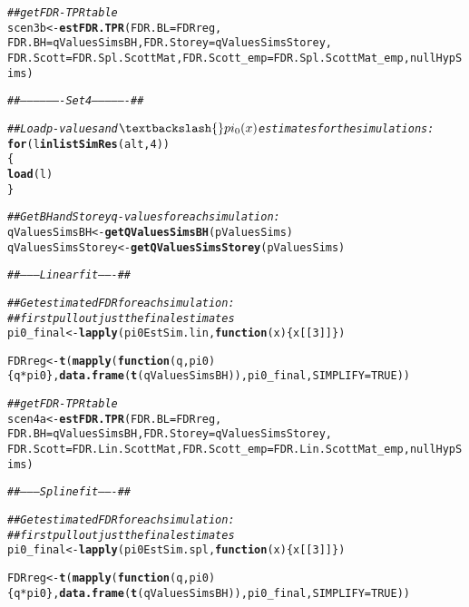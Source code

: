 \documentclass{article}\usepackage[]{graphicx}\usepackage[]{color}
\makeatletter
\newcommand{\hlnum}[1]{\textcolor[rgb]{0.686,0.059,0.569}{#1}}%
\newcommand{\hlcom}[1]{\textcolor[rgb]{0.678,0.584,0.686}{\textit{#1}}}%
\newcommand{\hlopt}[1]{\textcolor[rgb]{0,0,0}{#1}}%
\newcommand{\hlstd}[1]{\textcolor[rgb]{0.345,0.345,0.345}{#1}}%
\newcommand{\hlkwa}[1]{\textcolor[rgb]{0.161,0.373,0.58}{\textbf{#1}}}%
\newcommand{\hlkwb}[1]{\textcolor[rgb]{0.69,0.353,0.396}{#1}}%
\newcommand{\hlkwc}[1]{\textcolor[rgb]{0.333,0.667,0.333}{#1}}%
\newcommand{\hlkwd}[1]{\textcolor[rgb]{0.737,0.353,0.396}{\textbf{#1}}}%
\newenvironment{kframe}{%
 \def\at@end@of@kframe{}%
 \ifinner\ifhmode%
  \def\at@end@of@kframe{\end{minipage}}%
  \begin{minipage}{\columnwidth}%
 \fi\fi%
 \def\FrameCommand##1{\hskip\@totalleftmargin \hskip-\fboxsep
 \colorbox{shadecolor}{##1}\hskip-\fboxsep
     \hskip-\linewidth \hskip-\@totalleftmargin \hskip\columnwidth}%
 \MakeFramed {\advance\hsize-\width
   \@totalleftmargin\z@ \linewidth\hsize
   \@setminipage}}%
 {\par\unskip\endMakeFramed%
 \at@end@of@kframe}
\newenvironment{knitrout}{}{} %
\makeatother
\begin{document}
\begin{knitrout}
\begin{kframe}
\begin{alltt}
  \hlcom{##get FDR-TPR table}
  \hlstd{scen3b} \hlkwb{<-} \hlkwd{estFDR.TPR}\hlstd{(}\hlkwc{FDR.BL} \hlstd{= FDRreg,}
                       \hlkwc{FDR.BH} \hlstd{= qValuesSimsBH,} \hlkwc{FDR.Storey} \hlstd{= qValuesSimsStorey,}
                       \hlkwc{FDR.Scott} \hlstd{= FDR.Spl.ScottMat,} \hlkwc{FDR.Scott_emp} \hlstd{= FDR.Spl.ScottMat_emp, nullHypSims)}

  \hlcom{##-------------------Set 4----------------##}

  \hlcom{##Load p-values and $\textbackslash{}pi_0(x)$ estimates for the simulations:}
  \hlkwa{for}\hlstd{(l} \hlkwa{in} \hlkwd{listSimRes}\hlstd{(alt,} \hlnum{4}\hlstd{))}
  \hlstd{\{}
    \hlkwd{load}\hlstd{(l)}
  \hlstd{\}}

  \hlcom{##Get BH and Storey q-values for each simulation:}
  \hlstd{qValuesSimsBH} \hlkwb{<-} \hlkwd{getQValuesSimsBH}\hlstd{(pValuesSims)}
  \hlstd{qValuesSimsStorey} \hlkwb{<-} \hlkwd{getQValuesSimsStorey}\hlstd{(pValuesSims)}

  \hlcom{##--------Linear fit-------##}

  \hlcom{##Get estimated FDR for each simulation:}
  \hlcom{##first pull out just the final estimates}
  \hlstd{pi0_final} \hlkwb{<-} \hlkwd{lapply}\hlstd{(pi0EstSim.lin,} \hlkwa{function}\hlstd{(}\hlkwc{x}\hlstd{)\{x[[}\hlnum{3}\hlstd{]]\})}

  \hlstd{FDRreg} \hlkwb{<-} \hlkwd{t}\hlstd{(}\hlkwd{mapply}\hlstd{(}\hlkwa{function}\hlstd{(}\hlkwc{q}\hlstd{,}\hlkwc{pi0}\hlstd{)\{q}\hlopt{*}\hlstd{pi0\},} \hlkwd{data.frame}\hlstd{(}\hlkwd{t}\hlstd{(qValuesSimsBH)), pi0_final,} \hlkwc{SIMPLIFY}\hlstd{=}\hlnum{TRUE}\hlstd{))}

  \hlcom{##get FDR-TPR table}
  \hlstd{scen4a} \hlkwb{<-} \hlkwd{estFDR.TPR}\hlstd{(}\hlkwc{FDR.BL} \hlstd{= FDRreg,}
                       \hlkwc{FDR.BH} \hlstd{= qValuesSimsBH,} \hlkwc{FDR.Storey} \hlstd{= qValuesSimsStorey,}
                       \hlkwc{FDR.Scott} \hlstd{= FDR.Lin.ScottMat,} \hlkwc{FDR.Scott_emp} \hlstd{= FDR.Lin.ScottMat_emp, nullHypSims)}

  \hlcom{##--------Spline fit-------##}

  \hlcom{##Get estimated FDR for each simulation:}
  \hlcom{##first pull out just the final estimates}
  \hlstd{pi0_final} \hlkwb{<-} \hlkwd{lapply}\hlstd{(pi0EstSim.spl,} \hlkwa{function}\hlstd{(}\hlkwc{x}\hlstd{)\{x[[}\hlnum{3}\hlstd{]]\})}

  \hlstd{FDRreg} \hlkwb{<-} \hlkwd{t}\hlstd{(}\hlkwd{mapply}\hlstd{(}\hlkwa{function}\hlstd{(}\hlkwc{q}\hlstd{,}\hlkwc{pi0}\hlstd{)\{q}\hlopt{*}\hlstd{pi0\},} \hlkwd{data.frame}\hlstd{(}\hlkwd{t}\hlstd{(qValuesSimsBH)), pi0_final,} \hlkwc{SIMPLIFY}\hlstd{=}\hlnum{TRUE}\hlstd{))}


\end{alltt}
\end{kframe}
\end{knitrout}
\end{document}
